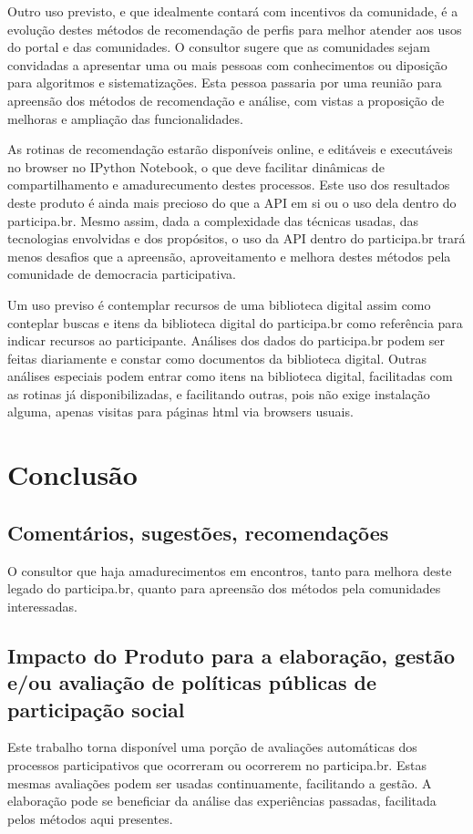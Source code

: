 \documentclass[12pt]{article}
\begin{document}
Outro uso previsto, e que idealmente contará com incentivos da comunidade, é a evolução destes métodos de recomendação de perfis para melhor atender aos usos do portal e das comunidades. O consultor sugere que as comunidades sejam convidadas a apresentar uma ou mais pessoas com conhecimentos ou diposição para algoritmos e sistematizações. Esta pessoa passaria por uma reunião para apreensão dos métodos de recomendação e análise, com vistas a proposição de melhoras e ampliação das funcionalidades.

As rotinas de recomendação estarão disponíveis online, e editáveis e executáveis no browser no IPython Notebook, o que deve facilitar dinâmicas de compartilhamento e amadurecumento destes processos. Este uso dos resultados deste produto é ainda mais precioso do que a API em si ou o uso dela dentro do participa.br. Mesmo assim, dada a complexidade das técnicas usadas, das tecnologias envolvidas e dos propósitos, o uso da API dentro do participa.br trará menos desafios que a apreensão, aproveitamento e melhora destes métodos pela comunidade de democracia participativa.

Um uso previso é contemplar recursos de uma biblioteca digital assim como conteplar buscas e itens da biblioteca digital do participa.br como referência para indicar recursos ao participante. Análises dos dados do participa.br podem ser feitas diariamente e constar como documentos da biblioteca digital. Outras análises especiais podem entrar como itens na biblioteca digital, facilitadas com as rotinas já disponibilizadas, e facilitando outras, pois não exige instalação alguma, apenas visitas para páginas html via browsers usuais.

\section{Conclusão}
\subsection{Comentários, sugestões, recomendações}
O consultor que haja amadurecimentos em encontros, tanto para melhora deste legado do participa.br, quanto para apreensão dos métodos pela comunidades interessadas. 
\subsection{Impacto do Produto para a elaboração, gestão e/ou avaliação de políticas públicas de participação social}
Este trabalho torna disponível uma porção de avaliações automáticas dos processos participativos que ocorreram ou ocorrerem no participa.br. Estas mesmas avaliações podem ser usadas continuamente, facilitando a gestão. A elaboração pode se beneficiar da análise das experiências passadas, facilitada pelos métodos aqui presentes.
\end{document}

